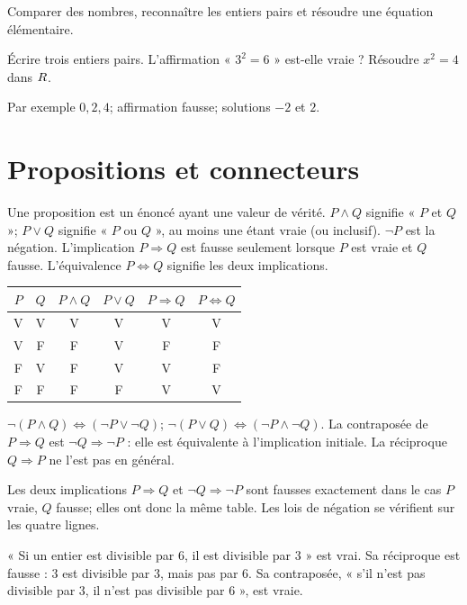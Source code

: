 \label{t11s-c06}
\begin{revision}Comparer des nombres, reconnaître les entiers pairs et résoudre une équation élémentaire.\end{revision}
\begin{automatismes}\exo\label{t11s-c06-auto}Écrire trois entiers pairs. L’affirmation « $3^2=6$ » est-elle vraie ? Résoudre $x^2=4$ dans $R$.\end{automatismes}
\begin{corrige}\label{sol-t11s-c06-auto}Par exemple $0,2,4$; affirmation fausse; solutions $-2$ et $2$.\end{corrige}

\section{Propositions et connecteurs}
\begin{definition}Une proposition est un énoncé ayant une valeur de vérité. $P\wedge Q$ signifie « $P$ et $Q$ »; $P\vee Q$ signifie « $P$ ou $Q$ », au moins une étant vraie (ou inclusif). $\neg P$ est la négation. L’implication $P\Rightarrow Q$ est fausse seulement lorsque $P$ est vraie et $Q$ fausse. L’équivalence $P\Leftrightarrow Q$ signifie les deux implications.\end{definition}
\begin{center}\begin{tabular}{cc|cccc}\toprule
$P$&$Q$&$P\wedge Q$&$P\vee Q$&$P\Rightarrow Q$&$P\Leftrightarrow Q$\\\midrule
V&V&V&V&V&V\\V&F&F&V&F&F\\F&V&F&V&V&F\\F&F&F&F&V&V\\\bottomrule
\end{tabular}\end{center}
\begin{propriete}
$\neg(P\wedge Q)\Leftrightarrow(\neg P\vee\neg Q)$;
$\neg(P\vee Q)\Leftrightarrow(\neg P\wedge\neg Q)$.
La contraposée de $P\Rightarrow Q$ est $\neg Q\Rightarrow\neg P$ : elle est équivalente à l’implication initiale. La réciproque $Q\Rightarrow P$ ne l’est pas en général.
\end{propriete}
\begin{demonstration}Les deux implications $P\Rightarrow Q$ et $\neg Q\Rightarrow\neg P$ sont fausses exactement dans le cas $P$ vraie, $Q$ fausse; elles ont donc la même table. Les lois de négation se vérifient sur les quatre lignes.\end{demonstration}
\begin{exemple}« Si un entier est divisible par $6$, il est divisible par $3$ » est vrai. Sa réciproque est fausse : $3$ est divisible par $3$, mais pas par $6$. Sa contraposée, « s’il n’est pas divisible par $3$, il n’est pas divisible par $6$ », est vraie.\end{exemple}
